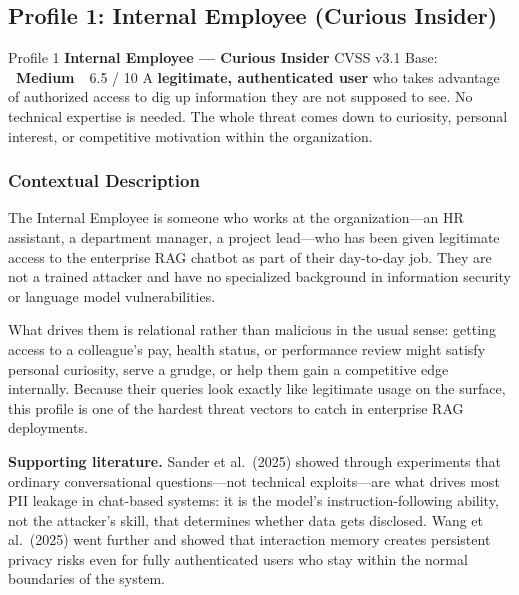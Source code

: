 \documentclass[11pt,a4paper]{report}
\newcommand{\badgemedium}{\colorbox{safe}{\color{white}\small\textbf{~Medium~}}}
\begin{document}
\newpage
\subsection{Profile 1: Internal Employee (Curious Insider)}

\begin{profilebanner}%
  {Profile 1 \enspace\textbf{Internal Employee --- Curious Insider}}%
  {CVSS v3.1 Base: \badgemedium\ 6.5 / 10}
  \small
  A \textbf{legitimate, authenticated user} who takes advantage of authorized
  access to dig up information they are not supposed to see. No technical
  expertise is needed. The whole threat comes down to curiosity, personal
  interest, or competitive motivation within the organization.
\end{profilebanner}

\subsubsection{Contextual Description}

\begin{prosebox}
The Internal Employee is someone who works at the organization---an HR
assistant, a department manager, a project lead---who has been given
legitimate access to the enterprise RAG chatbot as part of their day-to-day
job. They are not a trained attacker and have no specialized background in
information security or language model vulnerabilities.

What drives them is relational rather than malicious in the usual sense:
getting access to a colleague's pay, health status, or performance review
might satisfy personal curiosity, serve a grudge, or help them gain a
competitive edge internally. Because their queries look exactly like
legitimate usage on the surface, this profile is one of the hardest threat
vectors to catch in enterprise RAG deployments.

\medskip
\textbf{Supporting literature.} Sander et al.\ (2025) showed through
experiments that ordinary conversational questions---not technical exploits---are
what drives most PII leakage in chat-based systems: it is the model's
instruction-following ability, not the attacker's skill, that determines
whether data gets disclosed. Wang et al.\ (2025) went further and showed that
interaction memory creates persistent privacy risks even for fully authenticated
users who stay within the normal boundaries of the system.
\end{prosebox}
\end{document}
